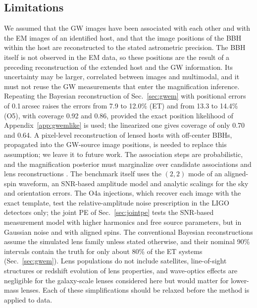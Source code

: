 \subsection{Limitations}
We assumed that the GW images have been associated with each other and with the EM images of an identified host, and that the image positions of the BBH within the host are reconstructed to the stated astrometric precision. The BBH itself is not observed in the EM data, so these positions are the result of a preceding reconstruction of the extended host and the GW information. Its uncertainty may be larger, correlated between images and multimodal, and it must not reuse the GW measurements that enter the magnification inference. Repeating the Bayesian reconstruction of Sec.~\ref{sec:gwem} with positional errors of 0.1\,arcsec raises the errors from 7.9 to 12.0\% (ET) and from 13.3 to 14.4\% (O5), with coverage 0.92 and 0.86, provided the exact position likelihood of Appendix~\ref{app:gwemlike} is used; the linearized one gives coverage of only 0.70 and 0.64. A pixel-level reconstruction of lensed hosts with off-center BBHs, propagated into the GW-source image positions, is needed to replace this assumption; we leave it to future work. The association steps are probabilistic, and the magnification posterior must marginalize over candidate associations and lens reconstructions \citep{hannuksela2020localizing,wempe2022lensing,uronen2026galacticcentres}. The benchmark itself uses the $(2,2)$ mode of an aligned-spin waveform, an SNR-based amplitude model and analytic scalings for the sky and orientation errors. The O4a injections, which recover each image with the exact template, test the relative-amplitude noise prescription in the LIGO detectors only; the joint PE of Sec.~\ref{sec:jointpe} tests the SNR-based measurement model with higher harmonics and free source parameters, but in Gaussian noise and with aligned spins. The conventional Bayesian reconstructions assume the simulated lens family unless stated otherwise, and their nominal 90\% intervals contain the truth for only about 80\% of the ET systems (Sec.~\ref{sec:gwem}). Lens populations do not include satellites, line-of-sight structures or redshift evolution of lens properties, and wave-optics effects are negligible for the galaxy-scale lenses considered here but would matter for lower-mass lenses. Each of these simplifications should be relaxed before the method is applied to data.

